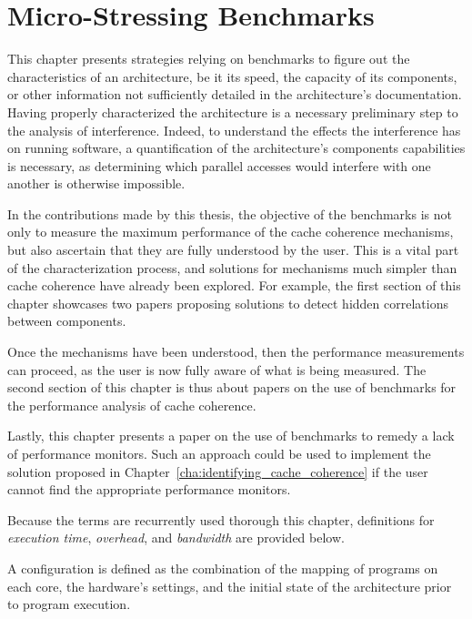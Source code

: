 \chapter{Micro-Stressing Benchmarks}
\label{cha:micro-benchs}
This chapter presents strategies relying on benchmarks to figure out the
characteristics of an architecture, be it its speed, the capacity of its
components, or other information not sufficiently detailed in the architecture's
documentation. Having properly characterized the architecture is a
necessary preliminary step to the analysis of interference. Indeed, to
understand the effects the interference has on running software, a
quantification of the architecture's components capabilities is necessary, as
determining which parallel accesses would interfere with one another is
otherwise impossible.

In the contributions made by this thesis, the objective of the benchmarks is not
only to measure the maximum performance of the cache coherence mechanisms, but
also ascertain that they are fully understood by the user. This is a vital part
of the characterization process, and solutions for mechanisms much simpler than
cache coherence have already been explored. For example, the first section of
this chapter showcases two papers proposing solutions to detect hidden
correlations between components.

Once the mechanisms have been understood, then the performance measurements can
proceed, as the user is now fully aware of what is being measured. The second
section of this chapter is thus about papers on the use of benchmarks for the
performance analysis of cache coherence.

Lastly, this chapter presents a paper on the use of benchmarks to remedy a lack
of performance monitors. Such an approach could be used to implement the
solution proposed in Chapter~\ref{cha:identifying_cache_coherence} if the user
cannot find the appropriate performance monitors.

Because the terms are recurrently used thorough this chapter, definitions for
\textit{execution time}, \textit{overhead}, and \textit{bandwidth} are provided below.

\begin{definition}[Configuration]
\label{def:configuration}
A configuration is defined as the combination of the mapping of programs on each
core, the hardware's settings, and the initial state of the architecture prior
to program execution.
\end{definition}

